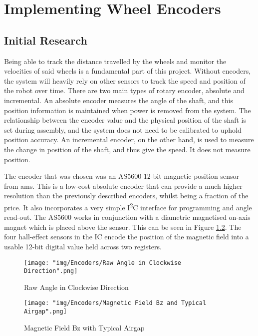 \newpage
\chapter{Implementing Wheel Encoders}
\section{Initial Research}

Being able to track the distance travelled by the wheels and monitor the velocities of said wheels is a fundamental part of this project. Without encoders, the system will heavily rely on other sensors to track the speed and position of the robot over time. There are two main types of rotary encoder, absolute and incremental. An absolute encoder measures the angle of the shaft, and this position information is maintained when power is removed from the system. The relationship between the encoder value and the physical position of the shaft is set during assembly, and the system does not need to be calibrated to uphold position accuracy. An incremental encoder, on the other hand, is used to measure the change in position of the shaft, and thus give the speed. It does not measure position.

The encoder that was chosen was an AS5600 12-bit magnetic position sensor from \gls{ams}. This is a low-cost absolute encoder that can provide a much higher resolution than the previously described encoders, whilst being a fraction of the price. It also incorporates a very simple I\textsuperscript{2}C interface for programming and angle read-out. The AS5600 works in conjunction with a diametric magnetised on-axis magnet which is placed above the sensor. This can be seen in Figure \ref{fig:airgapfig}. The four hall-effect sensors in the IC encode the position of the magnetic field into a usable 12-bit digital value held across two registers.

\begin{figure}[ht]
    \centering
    \texttt{[image: "img/Encoders/Raw Angle in Clockwise Direction".png]} 
    \caption{Raw Angle in Clockwise Direction \cite[fig.35]{as5600}}
    \label{fig:rawanglefig}
\end{figure}
\begin{figure}[ht]
    \centering
    \texttt{[image: "img/Encoders/Magnetic Field Bz and Typical Airgap".png]} 
    \caption{Magnetic Field Bz with Typical Airgap \cite[fig.40]{as5600}}
    \label{fig:airgapfig}
\end{figure}

